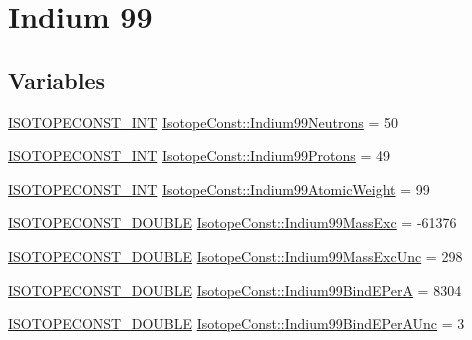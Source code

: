 \hypertarget{group___isotope_const-_indium-_in99}{}\section{Indium 99}
\label{group___isotope_const-_indium-_in99}
\subsection*{Variables}
\begin{DoxyCompactItemize}
\item 
\mbox{\hyperlink{group___isotope_const-_macros_ga5f18360b3e99483a35c32d789e62621c}{I\+S\+O\+T\+O\+P\+E\+C\+O\+N\+S\+T\+\_\+\+I\+NT}} \mbox{\hyperlink{group___isotope_const-_indium-_in99_ga00ea3b257e57711f87456b764e5001e2}{Isotope\+Const\+::\+Indium99\+Neutrons}} = 50
\item 
\mbox{\hyperlink{group___isotope_const-_macros_ga5f18360b3e99483a35c32d789e62621c}{I\+S\+O\+T\+O\+P\+E\+C\+O\+N\+S\+T\+\_\+\+I\+NT}} \mbox{\hyperlink{group___isotope_const-_indium-_in99_ga6592c2a5f3114d9c18024f02e4d4cdd4}{Isotope\+Const\+::\+Indium99\+Protons}} = 49
\item 
\mbox{\hyperlink{group___isotope_const-_macros_ga5f18360b3e99483a35c32d789e62621c}{I\+S\+O\+T\+O\+P\+E\+C\+O\+N\+S\+T\+\_\+\+I\+NT}} \mbox{\hyperlink{group___isotope_const-_indium-_in99_gafe646802b13471cf8b4d5feceb3e3b1d}{Isotope\+Const\+::\+Indium99\+Atomic\+Weight}} = 99
\item 
\mbox{\hyperlink{group___isotope_const-_macros_ga8f45a7272ce02c0b4c65c44636ed719a}{I\+S\+O\+T\+O\+P\+E\+C\+O\+N\+S\+T\+\_\+\+D\+O\+U\+B\+LE}} \mbox{\hyperlink{group___isotope_const-_indium-_in99_ga57450335f10dbccfe2015ff966a845df}{Isotope\+Const\+::\+Indium99\+Mass\+Exc}} = -\/61376
\item 
\mbox{\hyperlink{group___isotope_const-_macros_ga8f45a7272ce02c0b4c65c44636ed719a}{I\+S\+O\+T\+O\+P\+E\+C\+O\+N\+S\+T\+\_\+\+D\+O\+U\+B\+LE}} \mbox{\hyperlink{group___isotope_const-_indium-_in99_gac6885d9175f22d5402a070f36a38f2cb}{Isotope\+Const\+::\+Indium99\+Mass\+Exc\+Unc}} = 298
\item 
\mbox{\hyperlink{group___isotope_const-_macros_ga8f45a7272ce02c0b4c65c44636ed719a}{I\+S\+O\+T\+O\+P\+E\+C\+O\+N\+S\+T\+\_\+\+D\+O\+U\+B\+LE}} \mbox{\hyperlink{group___isotope_const-_indium-_in99_gaf74ea3cb30014b8f0608415ead7e9e39}{Isotope\+Const\+::\+Indium99\+Bind\+E\+PerA}} = 8304
\item 
\mbox{\hyperlink{group___isotope_const-_macros_ga8f45a7272ce02c0b4c65c44636ed719a}{I\+S\+O\+T\+O\+P\+E\+C\+O\+N\+S\+T\+\_\+\+D\+O\+U\+B\+LE}} \mbox{\hyperlink{group___isotope_const-_indium-_in99_gab51185996d8a800af7fa7d7b3b089243}{Isotope\+Const\+::\+Indium99\+Bind\+E\+Per\+A\+Unc}} = 3

\end{DoxyCompactItemize}
